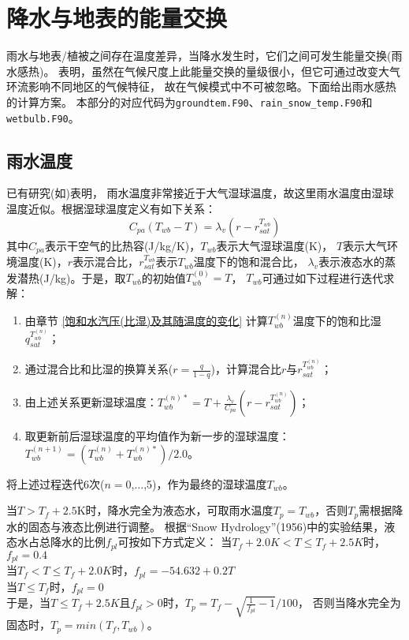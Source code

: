 \chapter{降水与地表的能量交换}

雨水与地表/植被之间存在温度差异，当降水发生时，它们之间可发生能量交换(雨水感热)。
\citet{wei2014impact} 表明，虽然在气候尺度上此能量交换的量级很小，但它可通过改变大气环流影响不同地区的气候特征，
故在气候模式中不可被忽略。下面给出雨水感热的计算方案。
本部分的对应代码为\texttt{groundtem.F90}、\texttt{rain_snow_temp.F90}和\texttt{wetbulb.F90}。
\section{雨水温度}\label{雨水温度}
已有研究(如\citet{anderson1998moored})表明，
雨水温度非常接近于大气湿球温度，故这里雨水温度由湿球温度近似。根据湿球温度定义有如下关系：
\begin{equation}
C_{p a}\left(T_{w b}-T\right)=\lambda_{v}\left(r-r_{s a t}^{T_{w b}}\right)
\end{equation}
其中$C_{pa}$表示干空气的比热容(J/kg/K)，$T_{wb}$表示大气湿球温度(K)，
$T$表示大气环境温度(K)，$r$表示混合比，$r_{sat}^{T_{wb}}$表示$T_{wb}$温度下的饱和混合比，
$\lambda_v$表示液态水的蒸发潜热(J/kg)。于是，取$T_{wb}$的初始值$T_{wb}^{\left(0\right)}=T$，
$T_{wb}$可通过如下过程进行迭代求解：
\begin{enumerate}
    \item 由章节 \ref{饱和水汽压(比湿)及其随温度的变化} 计算$T_{wb}^{\left(n\right)}$温度下的饱和比湿$q_{sat}^{T_{wb}^{\left(n\right)}}$；
    \item 通过混合比和比湿的换算关系($r=\frac{q}{1-q}$)，计算混合比$r$与$r_{sat}^{T_{wb}^{\left(n\right)}}$；
    \item 由上述关系更新湿球温度：$T_{wb}^{\left(n\right)\ast}=T+\frac{\lambda_v}{C_{pa}}\left(r-r_{sat}^{T_{wb}^{\left(n\right)}}\right)$；
    \item 取更新前后湿球温度的平均值作为新一步的湿球温度：$T_{wb}^{\left(n+1\right)}=\left(T_{wb}^{\left(n\right)}+T_{wb}^{\left(n\right)\ast}\right)/2.0$。
\end{enumerate}
将上述过程迭代6次($n=0$,$\ldots$,5)，作为最终的湿球温度$T_{wb}$。


当$T>T_f+2.5$K时，降水完全为液态水，可取雨水温度$T_p=T_{wb}$，否则$T_p$需根据降水的固态与液态比例进行调整。
根据“Snow Hydrology”(1956)中的实验结果，液态水占总降水的比例$f_{pl}$可按如下方式定义：
当$T_f+2.0K<T\le T_f+2.5K$时，$f_{pl}=0.4$ \\
当$T_f<T\le T_f+2.0K$时，$f_{pl}=-54.632+0.2T$ \\
当$T\le T_f$时，$f_{pl}=0$ \\
于是，当$T\le T_f+2.5K$且$f_{pl}>0$时，$T_p=T_f-\sqrt{\frac{1}{f_{pl}}-1}/100$，
否则当降水完全为固态时，$T_p=min{\left(T_f,T_{wb}\right)}$。


